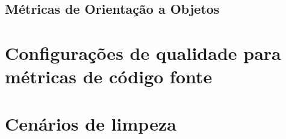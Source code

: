 \subsection{Métricas de Orientação a Objetos}


\section{Configurações de qualidade para métricas de código fonte} 


\section{Cenários de limpeza} 